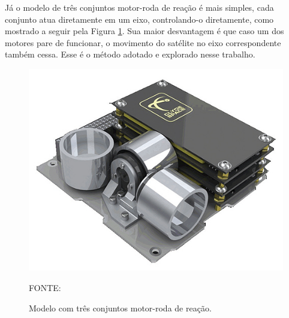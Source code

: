 \documentclass[
	12pt,				%
	openany,			%
	twoside,			%
	a4paper,			%
	english,			%
	french,				%
	spanish,			%
	brazil,				%
	oldfontcommands
	]{abntex2}
\begin{document}
\newpage

Já o modelo de três conjuntos motor-roda de reação é mais simples, cada conjunto atua diretamente em um eixo, controlando-o diretamente, como mostrado a seguir pela Figura \ref{fig:3RW}. Sua maior desvantagem é que caso um dos motores pare de funcionar, o movimento do satélite no eixo correspondente também cessa. Esse é o método adotado e explorado nesse trabalho.

\begin{figure}[th]
	\caption{Modelo com três conjuntos motor-roda de reação.}
	\centering
	\includegraphics[width=0.7\linewidth]{./figs/3RW}
	
	\begin{small}
		FONTE: \cite{3RW}
	\end{small}
	\label{fig:3RW}
\end{figure}




\end{document}
